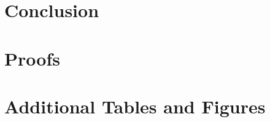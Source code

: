 \documentclass[12pt]{article}
\begin{document}
\section{Conclusion}
\label{sec:conclusion}






\newpage
\appendix
\section{Proofs}
\label{app:proofs}

\section{Additional Tables and Figures}
\label{app:additional}
\end{document}
